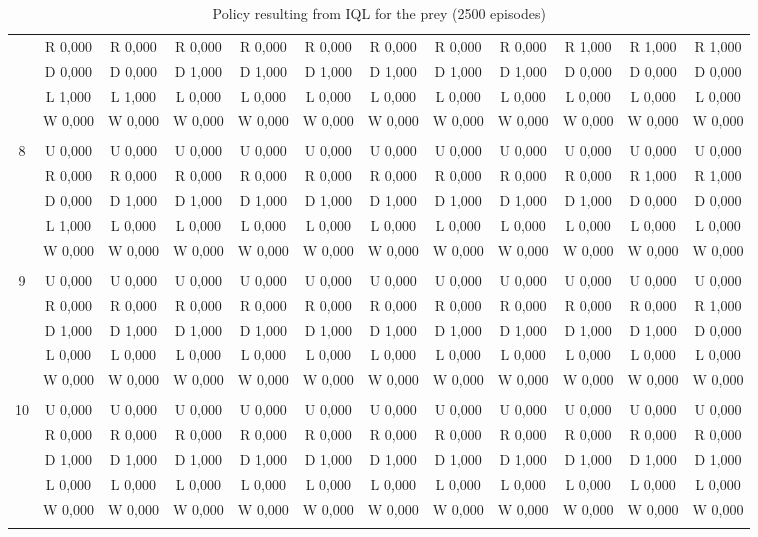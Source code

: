 \begin{table}[htbp]
\begin{tiny}
\begin{tabular}{c|c|c|c|c|c|c|c|c|c|c|c|}
&R 0,000&R 0,000&R 0,000&R 0,000&R 0,000&R 0,000&R 0,000&R 0,000&R 1,000&R 1,000&R 1,000\\
&D 0,000&D 0,000&D 1,000&D 1,000&D 1,000&D 1,000&D 1,000&D 1,000&D 0,000&D 0,000&D 0,000\\
&L 1,000&L 1,000&L 0,000&L 0,000&L 0,000&L 0,000&L 0,000&L 0,000&L 0,000&L 0,000&L 0,000\\
&W 0,000&W 0,000&W 0,000&W 0,000&W 0,000&W 0,000&W 0,000&W 0,000&W 0,000&W 0,000&W 0,000\\
\hline \\
8&U 0,000&U 0,000&U 0,000&U 0,000&U 0,000&U 0,000&U 0,000&U 0,000&U 0,000&U 0,000&U 0,000\\
&R 0,000&R 0,000&R 0,000&R 0,000&R 0,000&R 0,000&R 0,000&R 0,000&R 0,000&R 1,000&R 1,000\\
&D 0,000&D 1,000&D 1,000&D 1,000&D 1,000&D 1,000&D 1,000&D 1,000&D 1,000&D 0,000&D 0,000\\
&L 1,000&L 0,000&L 0,000&L 0,000&L 0,000&L 0,000&L 0,000&L 0,000&L 0,000&L 0,000&L 0,000\\
&W 0,000&W 0,000&W 0,000&W 0,000&W 0,000&W 0,000&W 0,000&W 0,000&W 0,000&W 0,000&W 0,000\\
\hline \\
9&U 0,000&U 0,000&U 0,000&U 0,000&U 0,000&U 0,000&U 0,000&U 0,000&U 0,000&U 0,000&U 0,000\\
&R 0,000&R 0,000&R 0,000&R 0,000&R 0,000&R 0,000&R 0,000&R 0,000&R 0,000&R 0,000&R 1,000\\
&D 1,000&D 1,000&D 1,000&D 1,000&D 1,000&D 1,000&D 1,000&D 1,000&D 1,000&D 1,000&D 0,000\\
&L 0,000&L 0,000&L 0,000&L 0,000&L 0,000&L 0,000&L 0,000&L 0,000&L 0,000&L 0,000&L 0,000\\
&W 0,000&W 0,000&W 0,000&W 0,000&W 0,000&W 0,000&W 0,000&W 0,000&W 0,000&W 0,000&W 0,000\\
\hline \\
10&U 0,000&U 0,000&U 0,000&U 0,000&U 0,000&U 0,000&U 0,000&U 0,000&U 0,000&U 0,000&U 0,000\\
&R 0,000&R 0,000&R 0,000&R 0,000&R 0,000&R 0,000&R 0,000&R 0,000&R 0,000&R 0,000&R 0,000\\
&D 1,000&D 1,000&D 1,000&D 1,000&D 1,000&D 1,000&D 1,000&D 1,000&D 1,000&D 1,000&D 1,000\\
&L 0,000&L 0,000&L 0,000&L 0,000&L 0,000&L 0,000&L 0,000&L 0,000&L 0,000&L 0,000&L 0,000\\
&W 0,000&W 0,000&W 0,000&W 0,000&W 0,000&W 0,000&W 0,000&W 0,000&W 0,000&W 0,000&W 0,000\\
\hline \\
\end{tabular}
\end{tiny}
\caption{Policy resulting from IQL for the prey (2500 episodes)}
\end{table}
